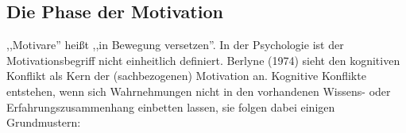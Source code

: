 


\subsection{Die Phase der Motivation}
,,Motivare'' hei{\ss}t ,,in Bewegung versetzen''.
In der Psychologie ist der Motivationsbegriff nicht einheitlich
definiert.
\bip
Berlyne (1974) sieht den kognitiven Konflikt als Kern der
(sachbezogenen) Motivation an.
Kognitive Konflikte entstehen, wenn sich Wahrnehmungen
nicht in den vorhandenen Wissens- oder Erfahrungszusammenhang
einbetten lassen, sie folgen dabei einigen Grundmustern:

